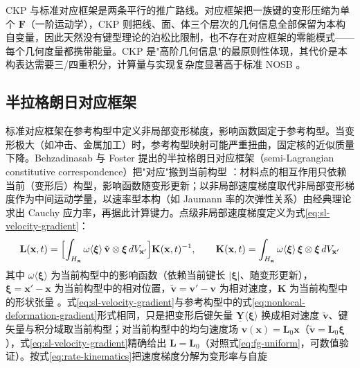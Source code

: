 \begin{remark}
  CKP 与标准对应框架是两条平行的推广路线。对应框架把一族键的变形压缩为单个 $\mathbf{F}$（一阶运动学），CKP 则把线、面、体三个层次的几何信息全部保留为本构自变量，因此天然没有键型理论的泊松比限制，也不存在对应框架的零能模式——每个几何度量都携带能量。CKP 是"高阶几何信息"的最原则性体现，其代价是本构表达需要三/四重积分，计算量与实现复杂度显著高于标准 NOSB \cite{Javili2019}。
\end{remark}

\subsection{半拉格朗日对应框架}\label{sec:semi-lagrangian}

标准对应框架在参考构型中定义非局部变形梯度，影响函数固定于参考构型。当变形极大（如冲击、金属加工）时，参考构型映射可能严重扭曲，固定核的近似质量下降。Behzadinasab 与 Foster 提出的半拉格朗日对应框架（semi-Lagrangian constitutive correspondence）把"对应"搬到当前构型 \cite{BehzadinasabFoster2020}：材料点的相互作用只依赖当前（变形后）构型，影响函数随变形更新；以非局部速度梯度取代非局部变形梯度作为中间运动学量，以速率型本构（如 Jaumann 率的次弹性关系）由经典理论求出 Cauchy 应力率，再据此计算键力。点级非局部速度梯度定义为式\eqref{eq:sl-velocity-gradient}：
\begin{equation}
  \mathbf{L}(\mathbf{x},t)
  =\Bigl[\int_{H_{\mathbf{x}}}\omega\langle\boldsymbol{\xi}\rangle\,
  \tilde{\mathbf{v}}\otimes\boldsymbol{\xi}\,dV_{\mathbf{x}'}\Bigr]\mathbf{K}(\mathbf{x},t)^{-1},\qquad
  \mathbf{K}(\mathbf{x},t)=\int_{H_{\mathbf{x}}}\omega\langle\boldsymbol{\xi}\rangle\,
  \boldsymbol{\xi}\otimes\boldsymbol{\xi}\,dV_{\mathbf{x}'}
  \label{eq:sl-velocity-gradient}
\end{equation}
其中 $\omega\langle\boldsymbol{\xi}\rangle$ 为当前构型中的影响函数（依赖当前键长 $|\boldsymbol{\xi}|$、随变形更新），$\boldsymbol{\xi}=\mathbf{x}'-\mathbf{x}$ 为当前构型中的相对位置，$\tilde{\mathbf{v}}=\mathbf{v}'-\mathbf{v}$ 为相对速度，$\mathbf{K}$ 为当前构型中的形状张量 \cite{BehzadinasabFoster2020}。式\eqref{eq:sl-velocity-gradient}与参考构型中的式\eqref{eq:nonlocal-deformation-gradient}形式相同，只是把变形后键矢量 $\underline{\mathbf{Y}}\langle\boldsymbol{\xi}\rangle$ 换成相对速度 $\tilde{\mathbf{v}}$、键矢量与积分域取当前构型；对当前构型中的均匀速度场 $\mathbf{v}(\mathbf{x})=\mathbf{L}_{0}\mathbf{x}$（$\tilde{\mathbf{v}}=\mathbf{L}_{0}\boldsymbol{\xi}$），式\eqref{eq:sl-velocity-gradient}精确给出 $\mathbf{L}=\mathbf{L}_{0}$（对照式\eqref{eq:fg-uniform}，可数值验证）。按式\eqref{eq:rate-kinematics}把速度梯度分解为变形率与自旋
